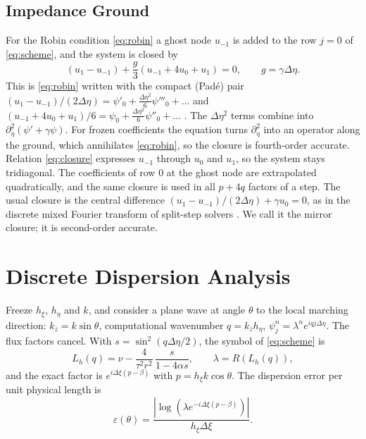 \documentclass[journal]{IEEEtran}
\newcommand{\het}{\nu}
\newcommand{\pd}{\partial}
\begin{document}
\subsection{Impedance Ground}\label{sec:impedance}
For the Robin condition \eqref{eq:robin} a ghost node $u_{-1}$ is added to the
row $j=0$ of \eqref{eq:scheme}, and the system is closed by
\begin{equation}\label{eq:closure}
\left(u_1-u_{-1}\right)+\frac{g}{3}\left(u_{-1}+4u_0+u_1\right)=0,\qquad g=\gamma\Delta\eta .
\end{equation}
This is \eqref{eq:robin} written with the compact (Pad\'e) pair
$(u_1-u_{-1})/(2\Delta\eta)=\psi'_0+\frac{\Delta\eta^2}{6}\psi'''_0+\dots$ and
$(u_{-1}+4u_0+u_1)/6=\psi_0+\frac{\Delta\eta^2}{6}\psi''_0+\dots$
\cite{lele1992compact}. The $\Delta\eta^2$ terms combine into
$\pd_\eta^2(\psi'+\gamma\psi)$. For frozen coefficients the equation turns
$\pd_\eta^2$ into an operator along the ground, which annihilates
\eqref{eq:robin}, so the closure is fourth-order accurate. Relation \eqref{eq:closure} expresses
$u_{-1}$ through $u_0$ and $u_1$, so the system stays tridiagonal. The
coefficients of row $0$ at the ghost node are extrapolated quadratically, and the
same closure is used in all $p+4q$ factors of a step. The usual closure is
the central difference $(u_1-u_{-1})/(2\Delta\eta)+\gamma u_0=0$, as in the
discrete mixed Fourier transform of split-step solvers \cite{dockery1996dmft}.
We call it the mirror closure; it is second-order accurate.

\section{Discrete Dispersion Analysis}\label{sec:dispersion}

Freeze $h_\xi$, $h_\eta$ and $k$, and consider a plane wave at angle
$\theta$ to the local marching direction: $k_z=k\sin\theta$, computational
wavenumber $q=k_zh_\eta$, $\psi^n_j=\lambda^ne^{iqj\Delta\eta}$. The flux
factors cancel. With $s=\sin^2(q\Delta\eta/2)$, the symbol of \eqref{eq:scheme}
is
\begin{equation}\label{eq:Lh}
L_h(q)=\het-\frac{4}{\tau^2r^2}\,\frac{s}{1-4\alpha s},\qquad\lambda=R\left(L_h(q)\right),
\end{equation}
and the exact factor is $e^{i\Delta\xi(p-\beta)}$ with $p=h_\xi k\cos\theta$.
The dispersion error per unit physical length is
\begin{equation}\label{eq:disp}
\varepsilon(\theta)=\frac{\left|\log\left(\lambda e^{-i\Delta\xi(p-\beta)}\right)\right|}{h_\xi\Delta\xi}.
\end{equation}
\end{document}
